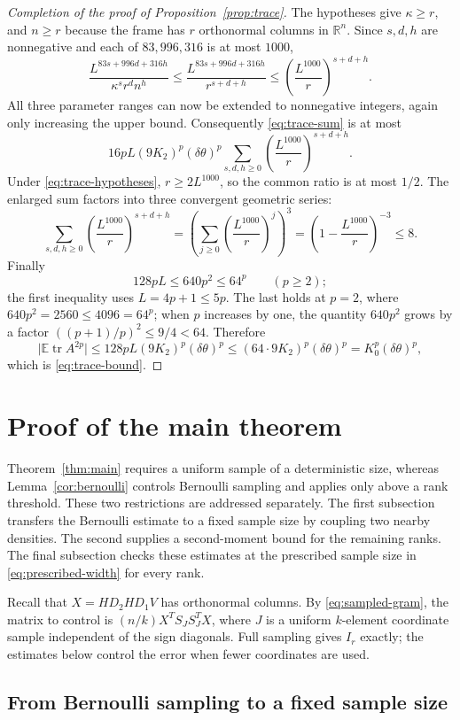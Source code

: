 \documentclass[11pt]{article}
\theoremstyle{definition}
\theoremstyle{remark}
\theoremstyle{plain}
\newcommand{\E}{\mathbb E}
\newcommand{\R}{\mathbb R}
\DeclareMathOperator{\tr}{tr}
\begin{document}
\begin{proof}[Completion of the proof of Proposition~\ref{prop:trace}]
The hypotheses give $\kappa\ge r$, and $n\ge r$ because the
frame has $r$ orthonormal columns in $\R^n$. Since $s,d,h$ are
nonnegative and each of $83,996,316$ is at most $1000$,
\[
 \frac{L^{83s+996d+316h}}{\kappa^s r^d n^h}
   \le\frac{L^{83s+996d+316h}}{r^{s+d+h}}
   \le\left(\frac{L^{1000}}r\right)^{s+d+h}.
\]
All three parameter ranges can now be extended to nonnegative
integers, again only increasing the upper bound. Consequently
\eqref{eq:trace-sum} is at most
\[
 16pL(9K_2)^p(\delta\theta)^p
          \sum_{s,d,h\ge0}\left(\frac{L^{1000}}r\right)^{s+d+h}.
\]
Under \eqref{eq:trace-hypotheses}, $r\ge2L^{1000}$, so the common
ratio is at most $1/2$. The enlarged sum factors into three
convergent geometric series:
\[
 \sum_{s,d,h\ge0}\left(\frac{L^{1000}}r\right)^{s+d+h}
   =\left(\sum_{j\ge0}\left(\frac{L^{1000}}r\right)^j\right)^3
   =\left(1-\frac{L^{1000}}r\right)^{-3}\le8.
\]
Finally
\[
 128pL\le640p^2\le64^p\qquad(p\ge2);
\]
the first inequality uses $L=4p+1\le5p$. The last holds at $p=2$,
where $640p^2=2560\le4096=64^p$; when $p$ increases by one,
the quantity $640p^2$ grows by a factor $((p+1)/p)^2\le9/4<64$.
Therefore
\[
 \bigl|\E\tr A^{2p}\bigr|
    \le128pL(9K_2)^p(\delta\theta)^p
    \le(64\cdot9K_2)^p(\delta\theta)^p
    =K_0^p(\delta\theta)^p,
\]
which is \eqref{eq:trace-bound}.
\end{proof}

\section{Proof of the main theorem}\label{sec:main-proof}

Theorem~\ref{thm:main} requires a uniform sample of a deterministic
size, whereas Lemma~\ref{cor:bernoulli} controls Bernoulli sampling
and applies only above a rank threshold. These two
restrictions are addressed separately. The first subsection transfers the Bernoulli
estimate to a fixed sample size by coupling two nearby densities.
The second supplies a second-moment bound for the remaining ranks.
The final subsection checks these estimates at the prescribed sample
size in \eqref{eq:prescribed-width} for every rank.

Recall that $X=HD_2HD_1V$ has orthonormal columns. By
\eqref{eq:sampled-gram}, the matrix to control is
$(n/k)X^TS_JS_J^TX$, where $J$ is a uniform $k$-element coordinate
sample independent of the sign diagonals. Full sampling gives $I_r$
exactly; the estimates below control the error when fewer coordinates are used.

\subsection{From Bernoulli sampling to a fixed sample size}
\end{document}
